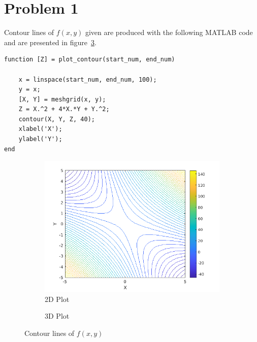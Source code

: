 \section{Problem 1}

Contour lines of $f(x,y)$ given are produced with the following MATLAB code and are presented in figure~\ref{fig:prob_1_contour_lines}.

\begin{lstlisting}[]
function [Z] = plot_contour(start_num, end_num)
	
	x = linspace(start_num, end_num, 100);
	y = x;
	[X, Y] = meshgrid(x, y);
	Z = X.^2 + 4*X.*Y + Y.^2;
	contour(X, Y, Z, 40);
	xlabel('X');
	ylabel('Y');
end
\end{lstlisting}
\begin{figure}[h]
	\centering
	\begin{subfigure}{0.4\textwidth}
		\includegraphics[width=\textwidth]{../Problem 1/contour_lines_2d.png}
		\caption{2D Plot}
		\label{fig:prob_1_contour_lines_2d}
	\end{subfigure}
	\begin{subfigure}{0.4\textwidth}
		
		\caption{3D Plot}
		\label{fig:prob_1_contour_lines_3d}
	\end{subfigure}
	\caption{Contour lines of $f(x,y)$ }
	\label{fig:prob_1_contour_lines}
\end{figure}

